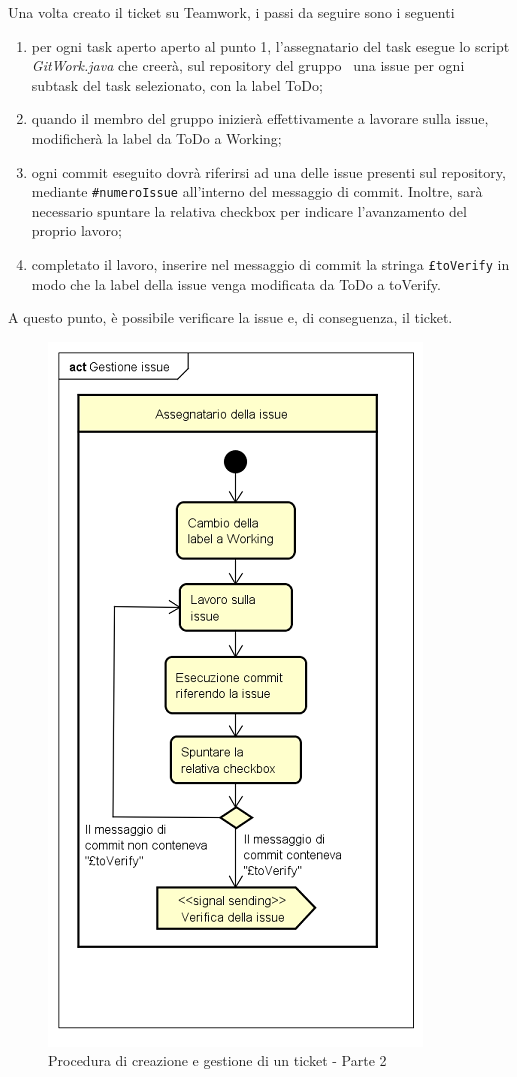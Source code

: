 \documentclass[../NormeProgetto.tex]{subfiles}
\begin{document}
			Una volta creato il ticket su Teamwork, i passi da seguire sono i seguenti			
				\begin{enumerate}
					\item per ogni task aperto aperto al punto 1, l'assegnatario del task esegue lo script \textit{GitWork.java} che creerà, sul repository del gruppo \leaf\ una issue per ogni subtask del task selezionato, con la label ToDo;
					\item quando il membro del gruppo inizierà effettivamente a lavorare sulla issue, modificherà la label da ToDo a Working;
					\item ogni commit eseguito dovrà riferirsi ad una delle issue presenti sul repository, mediante \texttt{\#numeroIssue} all'interno del messaggio di commit. Inoltre, sarà necessario spuntare la relativa checkbox per indicare l'avanzamento del proprio lavoro;
					\item completato il lavoro, inserire nel messaggio di commit la stringa \texttt{£toVerify} in modo che la label della issue venga modificata da ToDo a toVerify.
				\end{enumerate}
			A questo punto, è possibile verificare la issue e, di conseguenza, il ticket.
				\begin{figure}[H]
					\centering
					\includegraphics[scale=0.9]{sections/img/lavoroSuIssue.png}
					\caption{Procedura di creazione e gestione di un ticket - Parte 2}\label{fig:Procedura di creazione e gestione di un ticket - Parte 2} 
				\end{figure}
\end{document}
